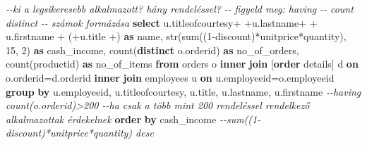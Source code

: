 \documentclass[
  magyar,
]{article}
\newenvironment{Shaded}{}{}
\newcommand{\CommentTok}[1]{\textcolor[rgb]{0.38,0.63,0.69}{\textit{#1}}}
\newcommand{\DecValTok}[1]{\textcolor[rgb]{0.25,0.63,0.44}{#1}}
\newcommand{\FunctionTok}[1]{\textcolor[rgb]{0.02,0.16,0.49}{#1}}
\newcommand{\KeywordTok}[1]{\textcolor[rgb]{0.00,0.44,0.13}{\textbf{#1}}}
\newcommand{\NormalTok}[1]{#1}
\newcommand{\OperatorTok}[1]{\textcolor[rgb]{0.40,0.40,0.40}{#1}}
\newcommand{\StringTok}[1]{\textcolor[rgb]{0.25,0.44,0.63}{#1}}
\begin{document}
\begin{Shaded}
\begin{Highlighting}[]
\CommentTok{{-}{-}ki a legsikeresebb alkalmazott? hány rendeléssel?}
\CommentTok{{-}{-} figyeld meg: having}
\CommentTok{{-}{-} count distinct}
\CommentTok{{-}{-} számok formázása}
\KeywordTok{select}\NormalTok{ u.titleofcourtesy}\OperatorTok{+}\StringTok{\textquotesingle{} \textquotesingle{}}\OperatorTok{+}\NormalTok{u.lastname}\OperatorTok{+}\StringTok{\textquotesingle{} \textquotesingle{}}\OperatorTok{+}\NormalTok{ u.firstname }\OperatorTok{+}\StringTok{\textquotesingle{} (\textquotesingle{}}\OperatorTok{+}\NormalTok{u.title }\OperatorTok{+}\StringTok{\textquotesingle{})\textquotesingle{}} \KeywordTok{as}\NormalTok{ name,}
\NormalTok{str(}\FunctionTok{sum}\NormalTok{((}\DecValTok{1}\OperatorTok{{-}}\NormalTok{discount)}\OperatorTok{*}\NormalTok{unitprice}\OperatorTok{*}\NormalTok{quantity), }\DecValTok{15}\NormalTok{, }\DecValTok{2}\NormalTok{) }\KeywordTok{as}\NormalTok{ cash\_income,}
\FunctionTok{count}\NormalTok{(}\KeywordTok{distinct}\NormalTok{ o.orderid) }\KeywordTok{as}\NormalTok{ no\_of\_orders, }\FunctionTok{count}\NormalTok{(productid) }\KeywordTok{as}\NormalTok{ no\_of\_items}
\KeywordTok{from}\NormalTok{ orders o }\KeywordTok{inner} \KeywordTok{join}\NormalTok{ [}\KeywordTok{order}\NormalTok{ details] d }\KeywordTok{on}\NormalTok{ o.orderid}\OperatorTok{=}\NormalTok{d.orderid}
\KeywordTok{inner} \KeywordTok{join}\NormalTok{ employees u }\KeywordTok{on}\NormalTok{ u.employeeid}\OperatorTok{=}\NormalTok{o.employeeid}
\KeywordTok{group} \KeywordTok{by}\NormalTok{ u.employeeid, u.titleofcourtesy, u.title, u.lastname, u.firstname}
\CommentTok{{-}{-}having count(o.orderid)\textgreater{}200 {-}{-}ha csak a több mint 200 rendeléssel rendelkező alkalmazottak érdekelnek}
\KeywordTok{order} \KeywordTok{by}\NormalTok{ cash\_income}
\CommentTok{{-}{-}sum((1{-}discount)*unitprice*quantity) desc}


\end{Highlighting}
\end{Shaded}
\end{document}
